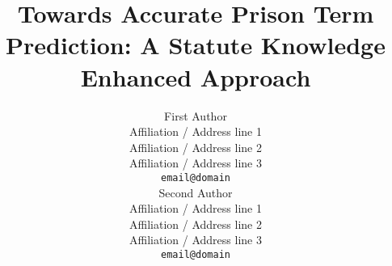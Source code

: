 \documentclass[11pt]{article}
\title{Towards Accurate Prison Term Prediction: A Statute Knowledge Enhanced Approach}
\author{First Author \\
  Affiliation / Address line 1 \\
  Affiliation / Address line 2 \\
  Affiliation / Address line 3 \\
  \texttt{email@domain} \\\And
  Second Author \\
  Affiliation / Address line 1 \\
  Affiliation / Address line 2 \\
  Affiliation / Address line 3 \\
  \texttt{email@domain} \\}
\begin{document}
\maketitle
\begin{abstract}

\end{abstract}










%


\appendix
% 
% 


\end{document}
